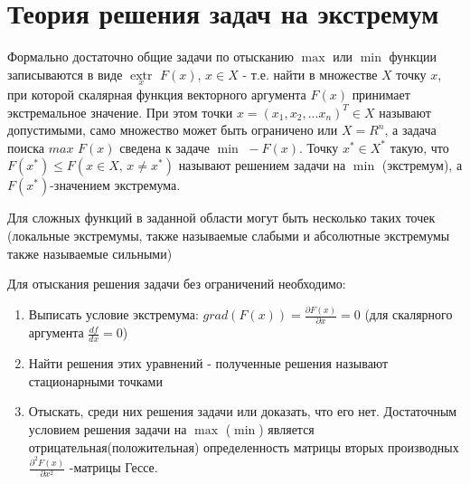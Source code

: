 \documentclass[preprint,russian,a5paper,10pt,twoside]{ncc}
\begin{document}
\section{Теория решения задач на экстремум\label{extremum}}
Формально достаточно общие задачи по отысканию $\max$  или $\min$ функции записываются в виде $\underset{x}{\mathop{extr}}\,\,F\left( x \right)$, $x\in X$ - т.е. найти в множестве $X$ точку $x$, при которой скалярная функция векторного аргумента $F\left( x \right)$ принимает экстремальное значение. При этом точки $x={{\left( {{x}_{1}},{{x}_{2}},...{{x}_{n}} \right)}^{T}}\in X$ называют допустимыми, само множество может быть ограничено или $X={{R}^{n}}$, а задача поиска $max \,\,F\left( x \right)$ сведена к задаче $\min \,\,-F\left( x \right)$. Точку ${{x}^{*}}\in {{X}^{*}}$ такую, что $F\left( {{x}^{*}} \right)\le F\left( x\in X,\,x\ne {{x}^{*}} \right)$ называют решением задачи на $\min$ (экстремум), а $F\left( {{x}^{*}} \right)$-значением экстремума.
\par Для сложных функций в заданной области могут быть несколько таких точек (локальные экстремумы, также называемые слабыми и абсолютные экстремумы также называемые сильными)
\par Для отыскания решения задачи без ограничений необходимо:
\begin{enumerate}
\item Выписать условие экстремума: $grad\left( F\left( x \right) \right)=\frac{\partial F\left( x \right)}{\partial x}=0$ (для скалярного аргумента $\frac{df}{dx}=0$)
\item Найти решения этих уравнений - полученные решения называют стационарными точками
\item Отыскать, среди них решения задачи или доказать, что его нет. Достаточным условием решения задачи на $\max$ ($\min$) является отрицательная(положительная) определенность матрицы вторых производных $\frac{{{\partial }^{2}}F\left( x \right)}{\partial {{x}^{2}}}$ -матрицы Гессе.
\end{enumerate}
\end{document}
